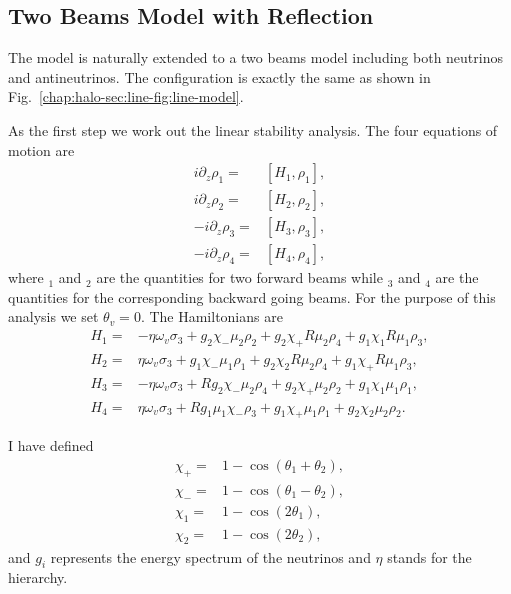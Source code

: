 \subsection{Two Beams Model with Reflection}

The model is naturally extended to a two beams model including both neutrinos and antineutrinos. The configuration is exactly the same as shown in Fig.~\ref{chap:halo-sec:line-fig:line-model}.

As the first step we work out the linear stability analysis. The four equations of motion are
\begin{align}
    i \partial_z \rho_1 = & [ H_1, \rho_1 ], \\
    i \partial_z \rho_2 = & [ H_2, \rho_2 ], \\
    -i \partial_z \rho_3 = & [ H_3, \rho_3 ], \\
    -i \partial_z \rho_4 = & [ H_4, \rho_4 ],
\end{align}
where ${}_1$ and ${}_2$ are the quantities for two forward beams while ${}_3$ and ${}_4$ are the quantities for the corresponding backward going beams. For the purpose of this analysis we set $\theta_v = 0$. The Hamiltonians are
\begin{align}
    H_1 =& -\eta \omega_v \sigma_3 + g_2 \chi_- \mu_2 \rho_2 + g_2 \chi_+ R \mu_2 \rho_4 + g_1 \chi_1 R \mu_1 \rho_3, \\
    H_2 =& \eta \omega_v \sigma_3 + g_1 \chi_- \mu_1 \rho_1 + g_2 \chi_2 R \mu_2 \rho_4 + g_1 \chi_+ R \mu_1 \rho_3, \\
    H_3 =& -\eta \omega_v \sigma_3 + R g_2 \chi_- \mu_2 \rho_4 + g_2 \chi_+\mu_2 \rho_2 + g_1 \chi_1 \mu_1 \rho_1, \\
    H_4 =& \eta \omega_v \sigma_3 + R g_1 \mu_1 \chi_- \rho_3 + g_1 \chi_+ \mu_1 \rho_1 + g_2 \chi_2 \mu_2 \rho_2.
\end{align}

I have defined
\begin{align*}
    \chi_+ = & 1 - \cos ( \theta_1 + \theta_2 ), \\
    \chi_- = & 1 - \cos ( \theta_1 - \theta_2 ), \\
    \chi_1 = & 1 - \cos ( 2\theta_1 ), \\
    \chi_2 = & 1 - \cos ( 2\theta_2 ),
\end{align*}
and $g_i$ represents the energy spectrum of the neutrinos and $\eta$ stands for the hierarchy.


